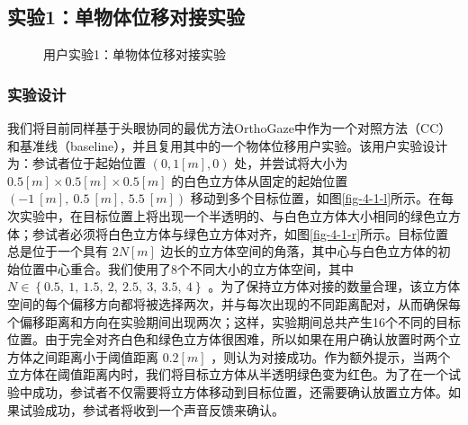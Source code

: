 \subsection{实验1：单物体位移对接实验}

\begin{figure}[b!]
    \centering
    \hspace{5em} %
    \caption{用户实验1：单物体位移对接实验}
    \label{fig-4-1}
\end{figure}

\subsubsection{实验设计}

我们将目前同样基于头眼协同的最优方法OrthoGaze中作为一个对照方法（CC）和基准线（baseline），并且复用其中的一个物体位移用户实验。该用户实验设计为：参试者位于起始位置 $(0, 1[m], 0)$ 处，并尝试将大小为 $0.5[m] \times 0.5[m] \times 0.5[m]$ 的白色立方体从固定的起始位置 $\left(-1\ \left[m\right],\ 0.5\ \left[m\right],\ 5.5\ \left[m\right]\right)$ 移动到多个目标位置，如图\ref{fig-4-1-l}所示。在每次实验中，在目标位置上将出现一个半透明的、与白色立方体大小相同的绿色立方体；参试者必须将白色立方体与绿色立方体对齐，如图\ref{fig-4-1-r}所示。目标位置总是位于一个具有 $2N\left[m\right]$ 边长的立方体空间的角落，其中心与白色立方体的初始位置中心重合。我们使用了8个不同大小的立方体空间，其中 $N \in \left\{0.5,\ 1,\ 1.5,\ 2,\ 2.5,\ 3,\ 3.5,\ 4\right\}$ 。为了保持立方体对接的数量合理，该立方体空间的每个偏移方向都将被选择两次，并与每次出现的不同距离配对，从而确保每个偏移距离和方向在实验期间出现两次；这样，实验期间总共产生16个不同的目标位置。由于完全对齐白色和绿色立方体很困难，所以如果在用户确认放置时两个立方体之间距离小于阈值距离 $0.2\left[m\right]$ ，则认为对接成功。作为额外提示，当两个立方体在阈值距离内时，我们将目标立方体从半透明绿色变为红色。为了在一个试验中成功，参试者不仅需要将立方体移动到目标位置，还需要确认放置立方体。如果试验成功，参试者将收到一个声音反馈来确认。

